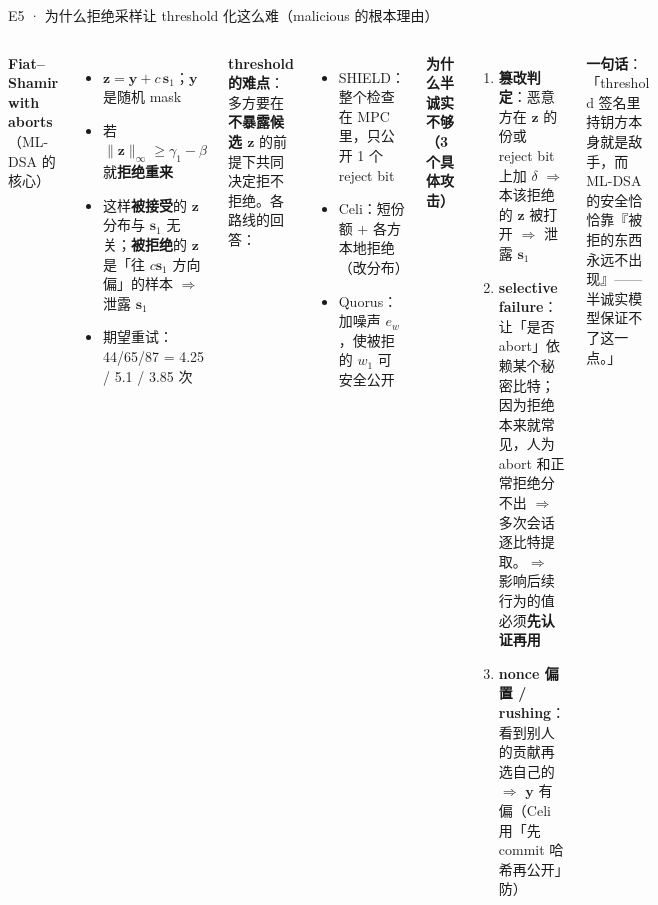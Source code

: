 \documentclass[aspectratio=169,10pt,fontset=none]{ctexbeamer}
\begin{document}
\begin{frame}{E5 · 为什么拒绝采样让 threshold 化这么难（malicious 的根本理由）}
\begin{columns}[T]
\textbf{Fiat--Shamir with aborts}（ML-DSA 的核心）
\begin{itemize}
  \item $\mathbf z=\mathbf y+c\,\mathbf s_1$；$\mathbf y$ 是随机 mask
  \item 若 $\|\mathbf z\|_\infty\ge\gamma_1-\beta$ 就\textbf{拒绝重来}
  \item 这样\textbf{被接受}的 $\mathbf z$ 分布与 $\mathbf s_1$ 无关；\textbf{被拒绝}的 $\mathbf z$ 是「往 $c\mathbf s_1$ 方向偏」的样本 $\Rightarrow$ 泄露 $\mathbf s_1$
  \item 期望重试：44/65/87 = 4.25 / 5.1 / 3.85 次
\end{itemize}
\textbf{threshold 的难点}：多方要在\textbf{不暴露候选 $\mathbf z$} 的前提下共同决定拒不拒绝。各路线的回答：
\begin{itemize}
  \item SHIELD：整个检查在 MPC 里，只公开 1 个 reject bit
  \item Celi：短份额 + 各方本地拒绝（改分布）
  \item Quorus：加噪声 $e_w$，使被拒的 $w_1$ 可安全公开
\end{itemize}
\textbf{为什么半诚实不够（3 个具体攻击）}
\begin{enumerate}
  \item \textbf{篡改判定}：恶意方在 $\mathbf z$ 的份或 reject bit 上加 $\delta$ $\Rightarrow$ 本该拒绝的 $\mathbf z$ 被打开 $\Rightarrow$ 泄露 $\mathbf s_1$
  \item \textbf{selective failure}：让「是否 abort」依赖某个秘密比特；因为拒绝本来就常见，人为 abort 和正常拒绝分不出 $\Rightarrow$ 多次会话逐比特提取。$\Rightarrow$ 影响后续行为的值必须\textbf{先认证再用}
  \item \textbf{nonce 偏置 / rushing}：看到别人的贡献再选自己的 $\Rightarrow$ $\mathbf y$ 有偏（Celi 用「先 commit 哈希再公开」防）
\end{enumerate}
\textbf{一句话}：「threshold 签名里持钥方本身就是敌手，而 ML-DSA 的安全恰恰靠『被拒的东西永远不出现』—— 半诚实模型保证不了这一点。」
\end{columns}
\end{frame}
\end{document}

